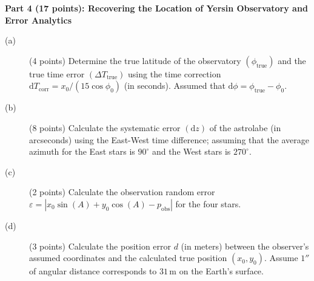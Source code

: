 \medskip\noindent\textbf{Part 4 (17 points): Recovering the Location of Yersin Observatory and Error Analytics}

\begin{description}
\item[(a)] (4 points) Determine the true latitude of the observatory
  $(\phi_{\mathrm{true}})$ and the true time error $(\Delta T_{\mathrm{true}})$
  using the time correction $\mathrm{d}T_{\mathrm{corr}} = x_0/(15\cos\phi_0)$
  (in seconds). Assumed that $\mathrm{d}\phi = \phi_{\mathrm{true}} - \phi_0$.
\item[(b)] (8 points) Calculate the systematic error $(\mathrm{d}z)$ of the
  astrolabe (in arcseconds) using the East-West time difference; assuming that
  the average azimuth for the East stars is $90^\circ$ and the West stars is
  $270^\circ$.
\item[(c)] (2 points) Calculate the observation random error
  $\varepsilon = |x_0\sin(A) + y_0\cos(A) - p_{\mathrm{obs}}|$ for the four
  stars.
\item[(d)] (3 points) Calculate the position error $d$ (in meters) between the
  observer's assumed coordinates and the calculated true position
  $(x_0, y_0)$. Assume $1''$ of angular distance corresponds to
  $31\,\mathrm{m}$ on the Earth's surface.
\end{description}
